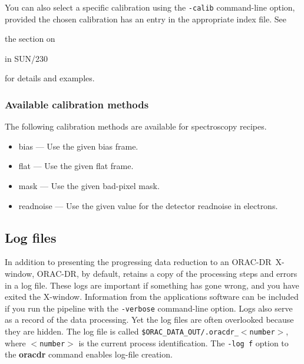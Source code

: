 \documentclass[twoside,11pt,nolof]{starlink}
\providecommand{\ORACDR}{{\footnotesize ORAC-DR}}
\begin{document}
You can also select a specific calibration using the \texttt{-calib}
command-line option, provided the chosen calibration has an entry
in the appropriate index file.  See
\begin{latexonly}
the section on
\end{latexonly}
\begin{latexonly}
in SUN/230
\end{latexonly}
for details and examples.

\subsubsection{Available calibration methods\label{available_calib}}

The following calibration methods are available for spectroscopy
recipes.

\begin{itemize}

\item bias --- Use the given bias frame.

\item flat --- Use the given flat frame.

\item mask --- Use the given bad-pixel mask.

\item readnoise --- Use the given value for the detector readnoise
in electrons.

\end{itemize}

\subsection{Log files\label{log_files}}

In addition to presenting the progressing data reduction to an
\ORACDR\ X-window, \ORACDR, by default, retains a copy of the
processing steps and errors in a log file.  These logs are important
if something has gone wrong, and you have exited the X-window.
Information from the applications software can be included if you run
the pipeline with the \texttt{-verbose} command-line option.  Logs also
serve as a record of the data processing.  Yet the log files are often
overlooked because they are hidden.  The log file is called
{\tt\$ORAC\_DATA\_OUT/.oracdr\_$<$number$>$}, where {\tt$<$number$>$}
is the current process identification.  The \texttt{-log f} option to the
\textbf{oracdr} command enables log-file creation.
\end{document}
